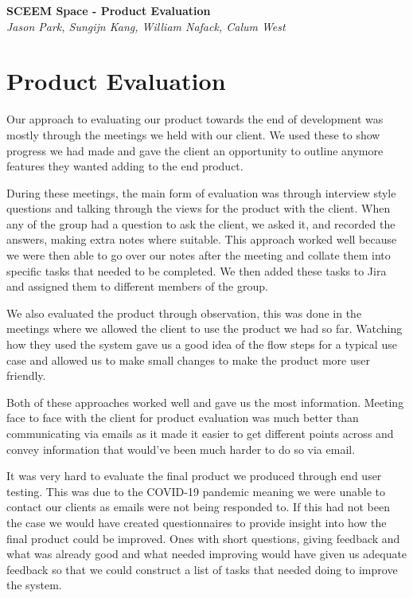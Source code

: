 \documentclass[11pt,a4paper]{article}
\begin{document}
\begin{titlepage}
   \begin{center}
      \Large\textbf{SCEEM Space - Product Evaluation}\\
      \large\textit{Jason Park, Sungijn Kang, William Nafack, Calum West}
   \end{center}
\end{titlepage}

\section{Product Evaluation}
Our approach to evaluating our product towards the end of development was mostly through the meetings we held with our client. We used these to show progress we had made and gave the client an opportunity to outline anymore features they wanted adding to the end product.
\bigskip

During these meetings, the main form of evaluation was through interview style questions and talking through the views for the product with the client. When any of the group had a question to ask the client, we asked it, and recorded the answers, making extra notes where suitable. This approach worked well because we were then able to go over our notes after the meeting and collate them into specific tasks that needed to be completed. We then added these tasks to Jira and assigned them to different members of the group.
\bigskip

We also evaluated the product through observation, this was done in the meetings where we allowed the client to use the product we had so far. Watching how they used the system gave us a good idea of the flow steps for a typical use case and allowed us to make small changes to make the product more user friendly.
\bigskip

Both of these approaches worked well and gave us the most information. Meeting face to face with the client for product evaluation was much better than communicating via emails as it made it easier to get different points across and convey information that would've been much harder to do so via email.
\bigskip

It was very hard to evaluate the final product we produced through end user testing. This was due to the COVID-19 pandemic meaning we were unable to contact our clients as emails were not being responded to. If this had not been the case we would have created questionnaires to provide insight into how the final product could be improved. Ones with short questions, giving feedback and what was already good and what needed improving would have given us adequate feedback so that we could construct a list of tasks that needed doing to improve the system.
\bigskip
\end{document}
